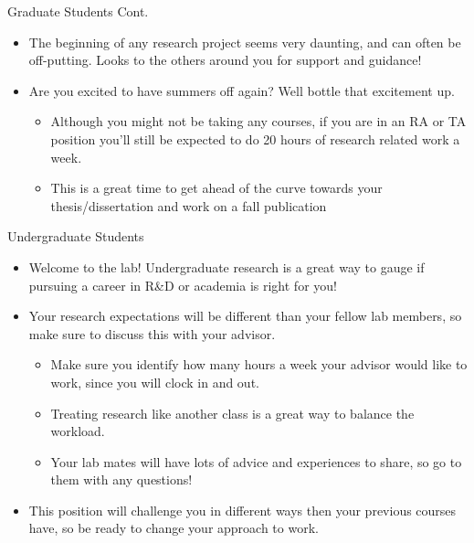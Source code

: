 \documentclass[handout]{beamer}
\begin{document}
\begin{frame}{Graduate Students Cont.}
  \begin{itemize}
    \item The beginning of any research project seems very daunting, and can often be off-putting. Looks to the others around you for support and guidance!
    \item Are you excited to have summers off again? Well bottle that excitement up.
    \begin{itemize}
        \item Although you might not be taking any courses, if you are in an RA or TA position you'll still be expected to do 20 hours of research related work a week.
        \item This is a great time to get ahead of the curve towards your thesis/dissertation and work on a fall publication
    \end{itemize}
  \end{itemize}
  \end{frame}

\begin{frame}{Undergraduate Students}
\begin{itemize}
  \item Welcome to the lab! Undergraduate research is a great way to gauge if pursuing a career in R\&D or academia is right for you!
  \item Your research expectations will be different than your fellow lab members, so make sure to discuss this with your advisor.
  \begin{itemize}
      \item Make sure you identify how many hours a week your advisor would like to work, since you will clock in and out. 
      \item Treating research like another class is a great way to balance the workload.
      \item Your lab mates will have lots of advice and experiences to share, so go to them with any questions!
  \end{itemize}
  \item This position will challenge you in different ways then your previous courses have, so be ready to change your approach to work.
\end{itemize}
\end{frame}
\end{document}
